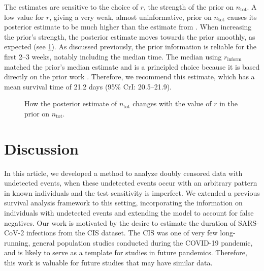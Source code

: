 \documentclass[12pt]{article}
\newcommand{\ntot}{n_\text{tot}}
\newcommand{\inform}{{_{\text{inform}}}}
\begin{document}
The estimates are sensitive to the choice of $r$, the strength of the prior on $\ntot$.
A low value for $r$, giving a very weak, almost uninformative, prior on $\ntot$ causes its posterior estimate to be much higher than the estimate from \citet{birrellRTM2}.
When increasing the prior's strength, the posterior estimate moves towards the prior smoothly, as expected (see \cref{imperf-test:fig:ntot}).
As discussed previously, the prior information is reliable for the first 2--3 weeks, notably including the median time.
The median using $r\inform$ matched the prior's median estimate and is a principled choice because it is based directly on the prior work \citet{birrellRTM2}.
Therefore, we recommend this estimate, which has a mean survival time of 21.2 days (95\% CrI: 20.5--21.9).
\begin{figure}
  \caption[Sensitivity of $\ntot$'s posterior to its prior.]{How the posterior estimate of $\ntot$ changes with the value of $r$ in the prior on $\ntot$.}
  \label{imperf-test:fig:ntot}
\end{figure}


\section{Discussion} \label{sec:discussion}


In this article, we developed a method to analyze doubly censored data with undetected events, when these undetected events occur with an arbitrary pattern in known individuals and the test sensitivity is imperfect.
We extended a previous survival analysis framework to this setting, incorporating the information on individuals with undetected events and extending the model to account for false negatives.
Our work is motivated by the desire to estimate the duration of SARS-CoV-2 infections from the CIS dataset.
The CIS was one of very few long-running, general population studies conducted during the COVID-19 pandemic, and is likely to serve as a template for studies in future pandemics.
Therefore, this work is valuable for future studies that may have similar data.
\end{document}
